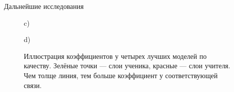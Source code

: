 \documentclass{beamer}
\begin{document}
\begin{frame}{Дальнейшие исследования}
\begin{figure}[H]
\begin{minipage}[h]{0.35\linewidth}
             c) \\
        \end{minipage}
        \hfill
        \begin{minipage}[h]{0.35\linewidth}
             d) \\
        \end{minipage}
        \caption{Иллюстрация коэффициентов у четырех лучших моделей по качеству. Зелёные точки --- слои ученика, красные --- слои учителя. Чем толще линия, тем больше коэффициент у соответствующей связи.}
    \end{figure}
\end{frame}

\end{document}
